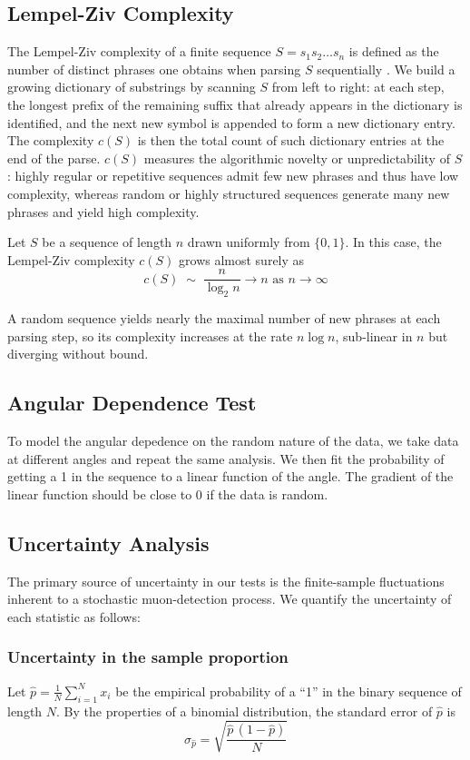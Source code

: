 \subsection{Lempel-Ziv Complexity}
The Lempel-Ziv complexity of a finite sequence $S = s_1 s_2 \dots s_n$ is defined as the number of distinct phrases one obtains when parsing $S$ sequentially \cite{lempel1976complexity}. We build a growing dictionary of substrings by scanning $S$ from left to right: at each step, the longest prefix of the remaining suffix that already appears in the dictionary is identified, and the next new symbol is appended to form a new dictionary entry.  The complexity $c(S)$ is then the total count of such dictionary entries at the end of the parse.  $c(S)$ measures the algorithmic novelty or unpredictability of $S$: highly regular or repetitive sequences admit few new phrases and thus have low complexity, whereas random or highly structured sequences generate many new phrases and yield high complexity. 

Let $S$ be a sequence of length $n$ drawn uniformly from $\{0,1\}$.  In this case, the Lempel-Ziv complexity $c(S)$ grows almost surely as
\begin{equation}
    c(S)\;\sim\;\frac{n}{\log_{2}n}\to n \text{ as } n\to\infty
\end{equation}

A random sequence yields nearly the maximal number of new phrases at each parsing step, so its complexity increases at the rate $n \log{n}$, sub-linear in $n$ but diverging without bound. 

\subsection{Angular Dependence Test}
To model the angular depedence on the random nature of the data, we take data at different angles and repeat the same analysis. We then fit the probability of getting a 1 in the sequence to a linear function of the angle. The gradient of the linear function should be close to 0 if the data is random.

\subsection{Uncertainty Analysis}
The primary source of uncertainty in our tests is the finite-sample fluctuations inherent to a stochastic muon-detection process.  We quantify the uncertainty of each statistic as follows:

\subsubsection{Uncertainty in the sample proportion}
Let $\hat p = \tfrac{1}{N}\sum_{i=1}^N x_i$ be the empirical probability of a “1” in the binary sequence of length $N$.  By the properties of a binomial distribution, the standard error of $\hat{p}$ is
\begin{equation}
\sigma_{\hat p}
= \sqrt{\frac{\hat p\,(1-\hat p)}{N}}
\end{equation}


